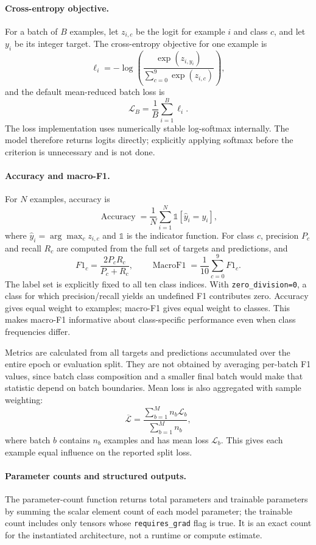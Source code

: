\documentclass[11pt,a4paper]{article}
\begin{document}
\paragraph{Cross-entropy objective.} For a batch of \(B\) examples, let \(z_{i,c}\) be the logit for example \(i\) and class \(c\), and let \(y_i\) be its integer target. The cross-entropy objective for one example is
\[
\ell_i=-\log \left( \frac{\exp(z_{i,y_i})}{\sum_{c=0}^{9}\exp(z_{i,c})} \right),
\]
and the default mean-reduced batch loss is
\[
\mathcal{L}_{B}=\frac{1}{B}\sum_{i=1}^{B}\ell_i.
\]
The loss implementation uses numerically stable log-softmax internally. The model therefore returns logits directly; explicitly applying softmax before the criterion is unnecessary and is not done.

\paragraph{Accuracy and macro-F1.} For \(N\) examples, accuracy is
\[
\operatorname{Accuracy} =\frac{1}{N}\sum_{i=1}^{N} \mathbb{1}[\widehat{y}_i=y_i],
\]
where \(\widehat{y}_i=\arg\max_c z_{i,c}\) and \(\mathbb{1}\) is the indicator function. For class \(c\), precision \(P_c\) and recall \(R_c\) are computed from the full set of targets and predictions, and
\[
F1_c=\frac{2P_cR_c}{P_c+R_c},\qquad \operatorname{MacroF1}=\frac{1}{10}\sum_{c=0}^{9}F1_c.
\]
The label set is explicitly fixed to all ten class indices. With \texttt{zero\_division=0}, a class for which precision/recall yields an undefined F1 contributes zero. Accuracy gives equal weight to examples; macro-F1 gives equal weight to classes. This makes macro-F1 informative about class-specific performance even when class frequencies differ.

Metrics are calculated from all targets and predictions accumulated over the entire epoch or evaluation split. They are not obtained by averaging per-batch F1 values, since batch class composition and a smaller final batch would make that statistic depend on batch boundaries. Mean loss is also aggregated with sample weighting:
\[
\overline{\mathcal{L}} =\frac{\sum_{b=1}^{M} n_b\mathcal{L}_b} {\sum_{b=1}^{M} n_b},
\]
where batch \(b\) contains \(n_b\) examples and has mean loss \(\mathcal{L}_b\). This gives each example equal influence on the reported split loss.

\paragraph{Parameter counts and structured outputs.} The parameter-count function returns total parameters and trainable parameters by summing the scalar element count of each model parameter; the trainable count includes only tensors whose \texttt{requires\_grad} flag is true. It is an exact count for the instantiated architecture, not a runtime or compute estimate.
\end{document}
